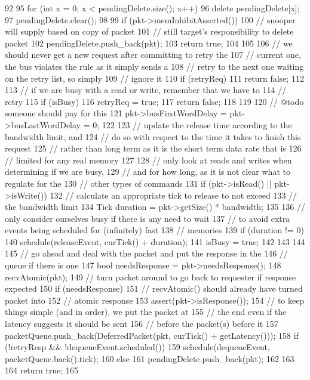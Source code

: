 \begin{DoxyCode}
92 {
95     for (int x = 0; x < pendingDelete.size(); x++)
96         delete pendingDelete[x];
97     pendingDelete.clear();
98 
99     if (pkt->memInhibitAsserted()) {
100         // snooper will supply based on copy of packet
101         // still target's responsibility to delete packet
102         pendingDelete.push_back(pkt);
103         return true;
104     }
105 
106     // we should never get a new request after committing to retry the
107     // current one, the bus violates the rule as it simply sends a
108     // retry to the next one waiting on the retry list, so simply
109     // ignore it
110     if (retryReq)
111         return false;
112 
113     // if we are busy with a read or write, remember that we have to
114     // retry
115     if (isBusy) {
116         retryReq = true;
117         return false;
118     }
119 
120     // @todo someone should pay for this
121     pkt->busFirstWordDelay = pkt->busLastWordDelay = 0;
122 
123     // update the release time according to the bandwidth limit, and
124     // do so with respect to the time it takes to finish this request
125     // rather than long term as it is the short term data rate that is
126     // limited for any real memory
127 
128     // only look at reads and writes when determining if we are busy,
129     // and for how long, as it is not clear what to regulate for the
130     // other types of commands
131     if (pkt->isRead() || pkt->isWrite()) {
132         // calculate an appropriate tick to release to not exceed
133         // the bandwidth limit
134         Tick duration = pkt->getSize() * bandwidth;
135 
136         // only consider ourselves busy if there is any need to wait
137         // to avoid extra events being scheduled for (infinitely) fast
138         // memories
139         if (duration != 0) {
140             schedule(releaseEvent, curTick() + duration);
141             isBusy = true;
142         }
143     }
144 
145     // go ahead and deal with the packet and put the response in the
146     // queue if there is one
147     bool needsResponse = pkt->needsResponse();
148     recvAtomic(pkt);
149     // turn packet around to go back to requester if response expected
150     if (needsResponse) {
151         // recvAtomic() should already have turned packet into
152         // atomic response
153         assert(pkt->isResponse());
154         // to keep things simple (and in order), we put the packet at
155         // the end even if the latency suggests it should be sent
156         // before the packet(s) before it
157         packetQueue.push_back(DeferredPacket(pkt, curTick() + getLatency()));
158         if (!retryResp && !dequeueEvent.scheduled())
159             schedule(dequeueEvent, packetQueue.back().tick);
160     } else {
161         pendingDelete.push_back(pkt);
162     }
163 
164     return true;
165 }
\end{DoxyCode}
